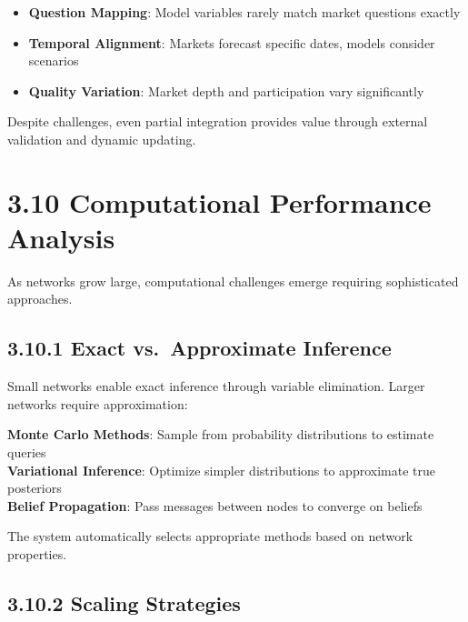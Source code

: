 \documentclass[
  11pt,
  letterpaper,
]{book}
\providecommand{\tightlist}{%
  \setlength{\itemsep}{0pt}\setlength{\parskip}{0pt}}
\begin{document}
\begin{itemize}
\tightlist
\item
  \textbf{Question Mapping}: Model variables rarely match market
  questions exactly
\item
  \textbf{Temporal Alignment}: Markets forecast specific dates, models
  consider scenarios
\item
  \textbf{Quality Variation}: Market depth and participation vary
  significantly
\end{itemize}

Despite challenges, even partial integration provides value through
external validation and dynamic updating.

\section*{3.10 Computational Performance
Analysis}\label{sec-computational-performance}


As networks grow large, computational challenges emerge requiring
sophisticated approaches.

\subsection*{3.10.1 Exact vs.~Approximate
Inference}\label{sec-exact-approximate}

Small networks enable exact inference through variable elimination.
Larger networks require approximation:

\textbf{Monte Carlo Methods}: Sample from probability distributions to
estimate queries\\
\textbf{Variational Inference}: Optimize simpler distributions to
approximate true posteriors\\
\textbf{Belief Propagation}: Pass messages between nodes to converge on
beliefs

The system automatically selects appropriate methods based on network
properties.

\subsection*{3.10.2 Scaling Strategies}\label{sec-scaling-strategies}
\end{document}
